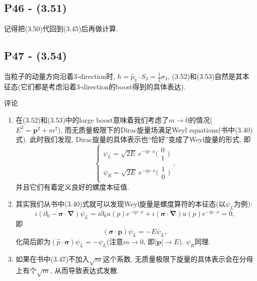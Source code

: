 \subsection{P46 - (3.51)}

记得把(3.50)代回到(3.45)后再做计算.

\subsection{P47 - (3.54)}
当粒子的动量方向沿着$3$-direction时, $h = \hat{p}_3\cdot S_3=\frac{1}{2}\sigma_3$, (3.52)和(3.53)自然是其本征态(它们都是考虑沿着$3$-direction的boost得到的具体表达).

\begin{mybox}{评论}
  \begin{enumerate}
    \item 在(3.52)和(3.53)中的large boost意味着我们考虑了$m\rightarrow 0$的情况($E^2 = \mathbf{p}^2 + m^2$), 而无质量极限下的Dirac旋量场满足Weyl equations(书中(3.40)式).
          此时我们发现, Dirac旋量的具体表示也“恰好”变成了Weyl旋量的形式, 即
          \begin{equation}
            \left\{\begin{array}{l}
              \psi_L = \sqrt{2E}\ e^{-ip\cdot x} \bigl(\begin{smallmatrix} 0 \\ 1 \end{smallmatrix}\bigr) \\
              \psi_R = \sqrt{2E}\ e^{-ip\cdot x} \bigl(\begin{smallmatrix} 1 \\ 0 \end{smallmatrix}\bigr)
            \end{array}\right.,
          \end{equation}
          并且它们有着定义良好的螺度本征值.
    \item 其实我们从书中(3.40)式就可以发现Weyl旋量是螺度算符的本征态(以$\psi_L$为例):
          \begin{equation}
            i(\partial_0 - \bm{\sigma}\cdot \bm{\nabla})\psi_L = i\partial_0 u(p)e^{-ip\cdot x} + i(\bm{\sigma}\cdot \bm{\nabla}) u(p)e^{-ip\cdot x} = 0,
          \end{equation}
          即
          \begin{equation}
            (\bm{\sigma} \cdot \mathbf{p})\psi_L = -E\psi_L,
          \end{equation}
          化简后即为$(\hat{p}\cdot \bm{\sigma})\psi_L = -\psi_L$(注意$m\rightarrow 0$, 即$|\mathbf{p}|\rightarrow E$).
          $\psi_R$同理.
    \item 如果在书中(3.47)不加入$\sqrt{m}$这个系数, 无质量极限下旋量的具体表示会在分母上有个$\sqrt{m}$, 从而导致表达式发散.
  \end{enumerate}
\end{mybox}

